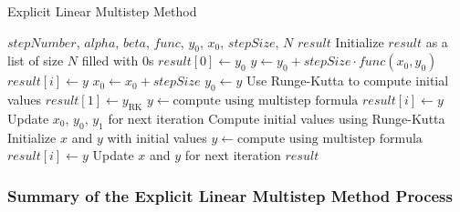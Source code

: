 \begin{algorithm}
    \caption{Explicit Linear Multistep Method}
    \begin{algorithmic}[1]
    \REQUIRE $stepNumber$, $alpha$, $beta$, $func$, $y_0$, $x_0$, $stepSize$, $N$
    \ENSURE $result$
    \STATE Initialize $result$ as a list of size $N$ filled with 0s
    \STATE $result[0] \gets y_0$
            \STATE $y \gets y_0 + stepSize \cdot func(x_0, y_0)$
            \STATE $result[i] \gets y$
            \STATE $x_0 \gets x_0 + stepSize$
            \STATE $y_0 \gets y$
        \ENDFOR
        \STATE Use Runge-Kutta to compute initial values
        \STATE $result[1] \gets y_{\text{RK}}$
            \STATE $y \gets \text{compute using multistep formula}$
            \STATE $result[i] \gets y$
            \STATE Update $x_0$, $y_0$, $y_1$ for next iteration
        \ENDFOR
    \ELSE
        \STATE Compute initial values using Runge-Kutta
        \STATE Initialize $x$ and $y$ with initial values
            \STATE $y \gets \text{compute using multistep formula}$
            \STATE $result[i] \gets y$
            \STATE Update $x$ and $y$ for next iteration
        \ENDFOR
    \ENDIF
    \RETURN $result$
    \end{algorithmic}
    \end{algorithm}

    \subsubsection*{Summary of the Explicit Linear Multistep Method Process}

